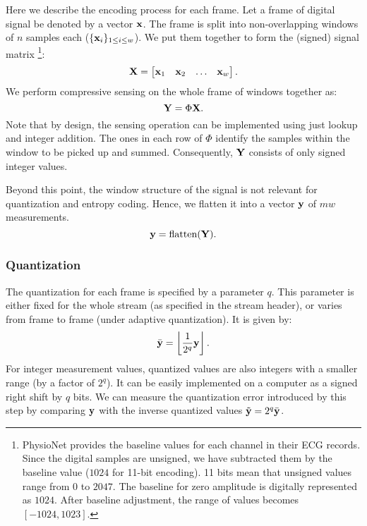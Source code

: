 Here we describe the encoding process for each frame.
Let a frame of digital signal be denoted by a vector $\mathbf{x}$.
The frame is split into non-overlapping windows of $n$
samples each ($\{\mathbf{x}_i\}_{1 \le i\le w}$).
We put them together to form the (signed) signal matrix
\footnote{
PhysioNet provides the baseline values for each channel
in their ECG records.
Since the digital samples are unsigned, we have subtracted
them by the baseline value ($1024$ for 11-bit encoding).
11 bits mean that unsigned values range from
$0$ to $2047$. The baseline for zero amplitude is
digitally represented as $1024$.
After baseline adjustment, the range of values becomes
$[-1024,1023]$.
}:
\begin{equation}
\mathbf{X} = \begin{bmatrix}
\mathbf{x}_1 & \mathbf{x}_2 & \dots & \mathbf{x}_w
\end{bmatrix}.
\end{equation}
We perform compressive sensing on the whole frame
of windows together as:
\begin{equation}
\mathbf{Y} = \Phi \mathbf{X}.
\end{equation}
Note that by design, the sensing operation can be implemented
using just lookup and integer addition. The ones
in each row of $\Phi$ identify the samples within the window
to be picked up and summed. Consequently, $\mathbf{Y}$ consists of
only signed integer values.

Beyond this point, the window structure of the signal is not
relevant for quantization and entropy coding.
Hence, we flatten it into a vector $\mathbf{y}$ of $m w$ measurements.
\begin{equation}
\mathbf{y} = \text{flatten}(\mathbf{Y}).
\end{equation}
\subsubsection{Quantization}
The quantization for each frame is specified by a parameter $q$.
This parameter is either fixed for the whole stream
(as specified in the stream header),
or varies from frame to frame (under adaptive quantization).
It is given by:
\begin{equation}
\bar{\mathbf{y}} = \left \lfloor \frac{1}{2^q} \mathbf{y} \right \rfloor.
\end{equation}
For integer measurement values, quantized values are also
integers with a smaller range (by a factor of $2^q$).
It can be easily implemented on a computer as a signed
right shift by $q$ bits.
We can measure the quantization error introduced by
this step by comparing $\mathbf{y}$ with the inverse quantized values
$\tilde{\mathbf{y}} = 2^q \bar{\mathbf{y}}$.

